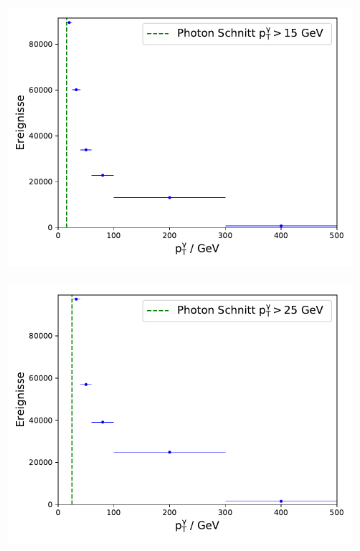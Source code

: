 \begin{figure}
    \begin{subfigure}[c]{0.5\textwidth}
      \includegraphics[width=\textwidth]{Plots/photon_pt_Atlas.pdf}
    \end{subfigure}
    \begin{subfigure}[c]{0.5\textwidth}
      \includegraphics[width=\textwidth]{Plots/photon_pt_Cms.pdf}
    \end{subfigure}
    \begin{subfigure}[c]{0.5\textwidth}

\end{subfigure}
\end{figure}
